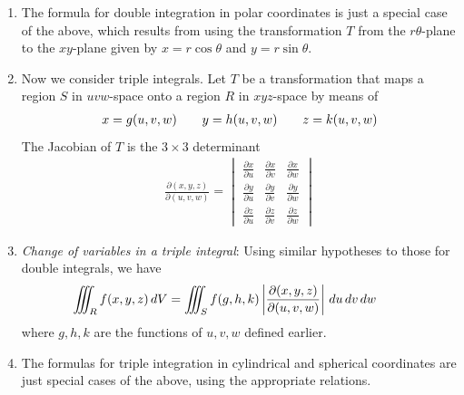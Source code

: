 \documentclass[10pt]{article}
\begin{document}
\begin{multicols}{2}
\begin{enumerate}
\begin{enumerate}
        \item The formula for double integration in polar coordinates is just a special case of the above, which results from using the transformation $T$ from the $r\theta$-plane to the $xy$-plane given by $x=r\cos{\theta}$ and $y=r\sin{\theta}$.
        \item Now we consider triple integrals. Let $T$ be a transformation that maps a region $S$ in $uvw$-space onto a region $R$ in $xyz$-space by means of 
        \begin{align*}
            x=g(u,v,w) \hspace{7mm} y=h(u,v,w) \hspace{7mm} z=k(u,v,w)
        \end{align*}
        The Jacobian of $T$ is the $3 \times 3$ determinant
        \begin{align*}
            \frac{\partial (x,y,z)}{\partial (u,v,w)} = 
            \begin{vmatrix}
                \frac{\partial x}{\partial u} & \frac{\partial x}{\partial v} & \frac{\partial x}{\partial w} \\[8pt]
                \frac{\partial y}{\partial u} & \frac{\partial y}{\partial v} & \frac{\partial y}{\partial w} \\[8pt]
                \frac{\partial z}{\partial u} & \frac{\partial z}{\partial v} & \frac{\partial z}{\partial w} 
            \end{vmatrix}
        \end{align*}
        \item \textit{Change of variables in a triple integral}: Using similar hypotheses to those for double integrals, we have
        \begin{align*}
        \hspace{-5mm}
            &\iiint_R f(x,y,z) \,dV = \iiint_S f(g, h, k) \left| \frac{\partial (x,y,z)}{\partial (u,v,w)} \right| \,du \,dv \,dw
        \end{align*}
        where $g,h,k$ are the functions of $u,v,w$ defined earlier.
        \item The formulas for triple integration in cylindrical and spherical coordinates are just special cases of the above, using the appropriate relations. 
    \end{enumerate}
\end{enumerate}


\end{multicols}
\end{document}
